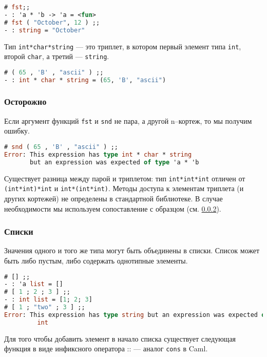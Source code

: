 \begin{lstlisting}[language=OCaml]
# fst;;
- : 'a * 'b -> 'a = <fun>
# fst ( "October", 12 ) ;;
- : string = "October"
\end{lstlisting}

Тип \texttt{int*char*string} --- это триплет, в котором первый элемент типа
\texttt{int}, второй \texttt{char}, а третий --- \texttt{string}.

\begin{lstlisting}[language=OCaml]
# ( 65 , 'B' , "ascii" ) ;;
- : int * char * string = (65, 'B', "ascii")
\end{lstlisting}

\subsubsection{Осторожно}

Если аргумент функций \texttt{fst} и \texttt{snd} не пара, а другой n--кортеж,
то мы получим ошибку.

\begin{lstlisting}[language=OCaml]
# snd ( 65 , 'B' , "ascii" ) ;;
Error: This expression has type int * char * string
       but an expression was expected of type 'a * 'b
\end{lstlisting}

Существует разница между парой и триплетом: тип \texttt{int*int*int} отличен от
\texttt{(int*int)*int} и \texttt{int*(int*int)}. Методы доступа к элементам
триплета (и других кортежей) не определены в стандартной библиотеке. В случае
необходимости мы используем сопоставление с образцом (см. \ref{}).

\subsubsection{Списки}

Значения одного и того же типа могут быть объединены в списки. Список может быть
либо пустым, либо содержать однотипные элементы.

\begin{lstlisting}[language=OCaml]
# [] ;;
- : 'a list = []
# [ 1 ; 2 ; 3 ] ;;
- : int list = [1; 2; 3]
# [ 1 ; "two" ; 3 ] ;;
Error: This expression has type string but an expression was expected of type
         int
\end{lstlisting}

Для того чтобы добавить элемент в начало списка существует следующая функция в
виде инфиксного оператора :: --- аналог \texttt{cons} в Caml.


